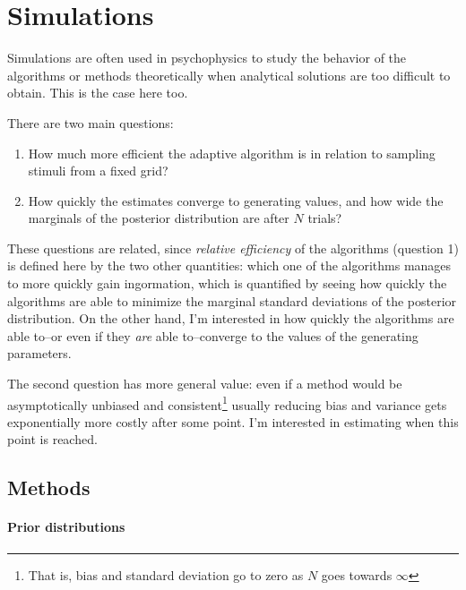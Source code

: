 \documentclass{article}\usepackage{knitr}
\begin{document}
\newpage

\tableofcontents

\newpage

\setcounter{page}{1}
\newpage


\section{Simulations}

Simulations are often used in psychophysics to study the behavior of the algorithms or methods theoretically when analytical solutions are too difficult to obtain. This is the case here too. 

There are two main questions: 

\begin{enumerate}
  \item How much more efficient the adaptive algorithm is in relation to sampling stimuli from a fixed grid? 
  \item How quickly the estimates converge to generating values, and how wide the marginals of the posterior distribution are after $N$ trials?
\end{enumerate}

These questions are related, since  \textit{relative efficiency} of the algorithms (question 1) is defined here by the two other quantities: which one of the algorithms manages to more quickly gain ingormation, which is quantified by seeing how quickly the algorithms are able to minimize the marginal standard deviations of the posterior distribution. On the other hand, I'm interested in how quickly the algorithms are able to--or even if they \textit{are} able to--converge to the values of the generating parameters.

The second question has more general value: even if a method would be asymptotically unbiased and consistent\footnote{That is, bias and standard deviation go to zero as $N$ goes towards $\infty$} usually reducing bias and variance gets exponentially more costly after some point. I'm interested in estimating when this point is reached. 

\subsection{Methods}

\paragraph{Prior distributions}
\end{document}
